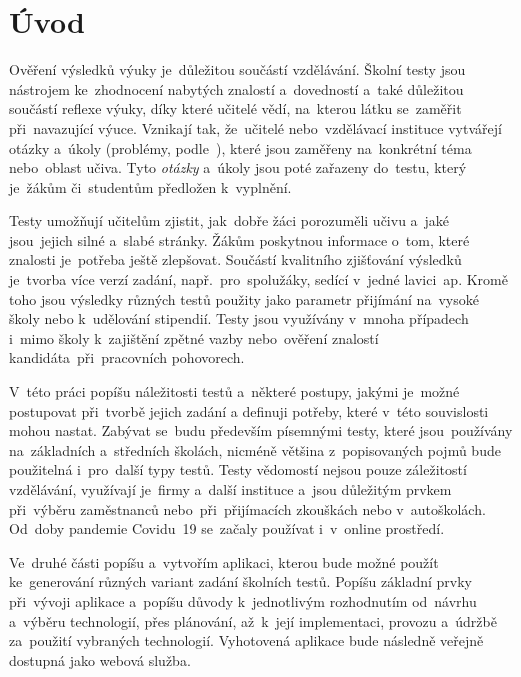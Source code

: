 \documentclass[11pt,a4paper]{report}
\begin{document}
    \setcounter{page}{1} %
    \tableofcontents
    
    \clearpage %
	
	\chapter{Úvod}
        Ověření výsledků výuky je~důležitou součástí vzdělávání. Školní testy jsou nástrojem ke~zhodnocení nabytých znalostí a~dovedností a~také důležitou součástí reflexe výuky, díky které učitelé vědí, na~kterou látku se~zaměřit při~navazující výuce. Vznikají tak, že~učitelé nebo~vzdělávací instituce vytvářejí otázky a~úkoly (problémy, podle~\cite{zhouf:tvorbamatproblemu}), které jsou zaměřeny na~konkrétní téma nebo~oblast učiva. Tyto \emph{otázky} a~úkoly jsou poté zařazeny do~testu, který je~žákům či~studentům předložen k~vyplnění.

        Testy umožňují učitelům zjistit, jak~dobře žáci porozuměli učivu a~jaké jsou~jejich silné a~slabé stránky. Žákům poskytnou informace o~tom, které znalosti je~potřeba ještě zlepšovat. Součástí kvalitního zjišťování výsledků je~tvorba více verzí zadání, např.~pro~spolužáky, sedící v~jedné lavici~ap. Kromě toho jsou výsledky různých testů použity jako parametr přijímání na~vysoké školy nebo k~udělování stipendií. Testy jsou využívány v~mnoha případech i~mimo školy k~zajištění zpětné vazby nebo~ověření znalostí kandidáta~při~pracovních pohovorech.
        
        V~této práci popíšu náležitosti testů a~některé postupy, jakými je~možné postupovat při~tvorbě jejich zadání a definuji potřeby, které v~této souvislosti mohou nastat. Zabývat se~budu především písemnými testy, které jsou~používány na~základních a~středních školách, nicméně většina z~popisovaných pojmů bude použitelná i~pro~další typy testů. Testy vědomostí nejsou pouze záležitostí vzdělávání, využívají je~firmy a~další instituce a~jsou důležitým prvkem při~výběru zaměstnanců nebo~při~přijímacích zkouškách nebo v~autoškolách. Od~doby pandemie Covidu~19 se~začaly používat i~v~online prostředí.
        
        Ve~druhé části popíšu a~vytvořím aplikaci, kterou bude možné použít ke~generování různých variant zadání školních testů. Popíšu základní prvky při~vývoji aplikace a~popíšu důvody k~jednotlivým rozhodnutím od~návrhu a~výběru technologií, přes plánování, až~k~její implementaci, provozu a~údržbě za~použití vybraných technologií. Vyhotovená aplikace bude následně veřejně dostupná jako webová služba.
\end{document}
